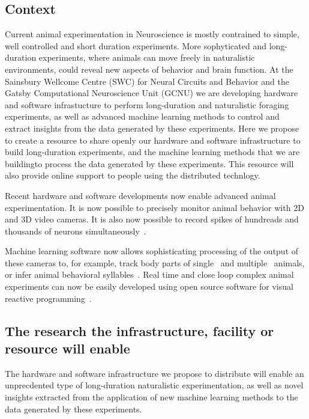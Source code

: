 \subsection{Context}

Current animal experimentation in Neuroscience is mostly contrained to simple,
well controlled and short duration experiments. 
%
More sophyticated and long-duration experiments, where animals can move freely
in naturalistic environments, could reveal new aspects of behavior and brain
function.
%
At the Sainsbury Wellcome Centre (SWC) for Neural Circuits and Behavior and the
Gatsby Computational Neuroscience Unit (GCNU) we are developing hardware and
software infrastucture to perform long-duration and naturalistic foraging
experiments, as well as advanced machine learning methods to control and
extract insights from the data generated by these experiments.
%
Here we propose to create a resource to share openly our hardware and software
infrastructure to build long-duration experiments, and the machine learning
methods that we are buildingto process the data generated by these experiments.
This resource will also provide online support to people using the distributed
technlogy.

%
Recent hardware and software developments now enable advanced animal
experimentation.
% 
It is now possible to precisely monitor animal behavior with 2D and 3D video
cameras.
%
It is also now possible to record spikes of hundreads and thousands of neurons
simultaneously~\citep{neuropixels}.

Machine learning software now allows sophisticating processing of the output of
these cameras to, for example, track body parts of single~\citep{deeplabCut}
and multiple~\citep{sleap} animals, or infer animal behavioral
syllables~\citep{moseq}.
%
Real time and close loop complex animal experiments can now be easily developed
using open source software for visual reactive programming~\citep{bonsai}.

\subsection{The research the infrastructure, facility or resource will enable}

The hardware and software infrastructure we propose to distribute will enable
an unprecdented type of long-duration naturalistic experimentation, as well as
novel insights extracted from the application of new machine learning methods
to the data generated by these experiments.

